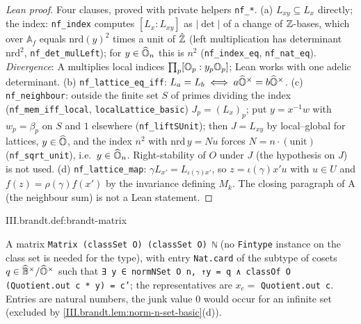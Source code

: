 \begin{proof}[Lean proof]
Four clauses, proved with private helpers \texttt{nf\_*}. (a) $L_{xy}\subseteq L_x$ directly; the index: \texttt{nf\_index} computes $[L_x:L_{xy}]$ as $|\det|$ of a change of $\mathbb{Z}$-bases, which over $\mathbb A_f$ equals $\mathrm{nrd}(y)^2$ times a unit of $\hat{\mathbb{Z}}$ (left multiplication has determinant $\mathrm{nrd}^2$, \texttt{nf\_det\_mulLeft}); for $y\in\widehat{\mathbb{O}}_n$ this is $n^2$ (\texttt{nf\_index\_eq}, \texttt{nf\_nat\_eq}). \emph{Divergence}: A multiplies local indices $\prod_p[\mathbb{O}_p:y_p\mathbb{O}_p]$; Lean works with one adelic determinant. (b) \texttt{nf\_lattice\_eq\_iff}: $L_a=L_b\iff a\widehat{\mathbb{O}}^\times=b\widehat{\mathbb{O}}^\times$. (c) \texttt{nf\_neighbour}: outside the finite set $S$ of primes dividing the index (\texttt{nf\_mem\_iff\_local}, \texttt{localLattice\_basic}) $J_p=(L_x)_p$; put $y=x^{-1}w$ with $w_p=\beta_p$ on $S$ and $1$ elsewhere (\texttt{nf\_liftSUnit}); then $J=L_{xy}$ by local--global for lattices, $y\in\widehat{\mathbb{O}}$, and the index $n^2$ with $\mathrm{nrd}\,y=Nu$ forces $N=n\cdot(\text{unit})$ (\texttt{nf\_sqrt\_unit}), i.e.\ $y\in\widehat{\mathbb{O}}_n$. Right-stability of $O$ under $J$ (the hypothesis on $J$) is not used. (d) \texttt{nf\_lattice\_map}: $\gamma L_{x'}=L_{\iota(\gamma)x'}$, so $z=\iota(\gamma)x'u$ with $u\in U$ and $f(z)=\rho(\gamma)f(x')$ by the invariance defining $M_k$. The closing paragraph of A (the neighbour sum) is not a Lean statement.
\end{proof}

\begin{definition}
\end{definition}
\begin{tfformal}{III.brandt.def:brandt-matrix}
\begin{tffidelity}
A matrix \texttt{Matrix (classSet O) (classSet O) ℕ} (no \texttt{Fintype} instance on the class set is needed for the type), with entry \texttt{Nat.card} of the subtype of cosets $q\in\widehat{\mathbb{B}}^\times/\widehat{\mathbb{O}}^\times$ such that \texttt{∃ y ∈ normNSet O n, ↑y = q ∧ classOf O (Quotient.out c * y) = c'}; the representatives are $x_c=$ \texttt{Quotient.out c}. Entries are natural numbers, the junk value $0$ would occur for an infinite set (excluded by \cref{III.brandt.lem:norm-n-set-basic}(d)).
\end{tffidelity}
\end{tfformal}

